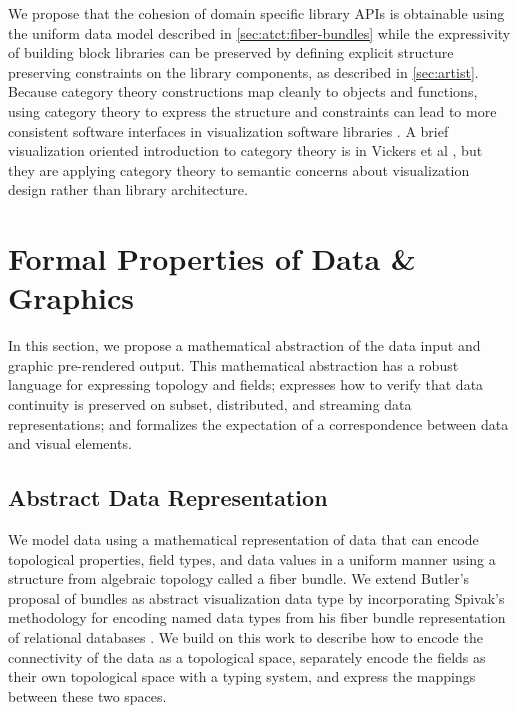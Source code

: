 \documentclass[journal]{IEEEtran}
\theoremstyle{definition}
\theoremstyle{remark}
\begin{document}
We propose that the cohesion of domain specific library APIs is obtainable using the uniform data model described in \autoref{sec:atct:fiber-bundles} while the expressivity of building block libraries can be preserved by defining explicit structure preserving constraints on the library components, as described in \autoref{sec:artist}. Because category theory constructions map cleanly to objects and functions, using category theory to express the structure and constraints can lead to more consistent software interfaces in visualization software libraries \cite{wielsManagementEvolvingSpecifications1998,yorgeyMonoidsThemeVariations2012}. A brief visualization oriented introduction to category theory is in Vickers et al \cite{vickersUnderstandingVisualizationFormal2013}, but they are applying category theory to semantic concerns about visualization design rather than library architecture.


\section{Formal Properties of Data \& Graphics}
\label{sec:atct}
In this section, we propose a mathematical abstraction of the data input and graphic pre-rendered output. This mathematical abstraction has a robust language for expressing topology and fields; expresses how to verify that data continuity is preserved on subset, distributed, and streaming data representations; and formalizes the expectation of a correspondence between data and visual elements.

\subsection{Abstract Data Representation}
\label{sec:atct:fiber-bundles}
We model data using a mathematical representation of data that can encode topological properties, field types, and data values in a uniform manner using a structure from algebraic topology called a fiber bundle. We extend Butler's proposal of bundles as abstract visualization data type \cite{butlerVectorBundleClassesForm1992,butlerVisualizationModelBased1989} by incorporating Spivak's methodology for encoding named data types from his fiber bundle representation of relational databases \cite{spivakDatabasesAreCategories2010,spivakSimplicialDatabases2009}. We build on this work to describe how to encode the connectivity of the data as a topological space, separately encode the fields as their own topological space with a typing system, and express the mappings between these two spaces.
\end{document}
